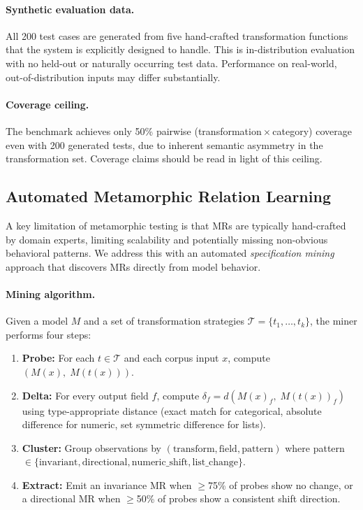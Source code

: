 \documentclass[sigconf,nonacm]{acmart}
\begin{document}
\paragraph{Synthetic evaluation data.}
All 200 test cases are generated from five hand-crafted transformation functions that the system is explicitly designed to handle.
This is in-distribution evaluation with no held-out or naturally occurring test data.
Performance on real-world, out-of-distribution inputs may differ substantially.

\paragraph{Coverage ceiling.}
The benchmark achieves only 50\% pairwise (transformation\,$\times$\,category) coverage even with 200 generated tests, due to inherent semantic asymmetry in the transformation set.
Coverage claims should be read in light of this ceiling.

\subsection{Automated Metamorphic Relation Learning}
\label{sec:auto-mr}

A key limitation of metamorphic testing is that MRs are typically hand-crafted by domain experts, limiting scalability and potentially missing non-obvious behavioral patterns.
We address this with an automated \emph{specification mining} approach that discovers MRs directly from model behavior.

\paragraph{Mining algorithm.}
Given a model $M$ and a set of transformation strategies $\mathcal{T} = \{t_1, \ldots, t_k\}$, the miner performs four steps:
\begin{enumerate}
  \item \textbf{Probe:} For each $t \in \mathcal{T}$ and each corpus input $x$, compute $(M(x),\; M(t(x)))$.
  \item \textbf{Delta:} For every output field $f$, compute $\delta_f = d(M(x)_f,\; M(t(x))_f)$ using type-appropriate distance (exact match for categorical, absolute difference for numeric, set symmetric difference for lists).
  \item \textbf{Cluster:} Group observations by $(\text{transform}, \text{field}, \text{pattern})$ where pattern $\in \{\text{invariant}, \text{directional}, \text{numeric\_shift}, \text{list\_change}\}$.
  \item \textbf{Extract:} Emit an invariance MR when $\geq$75\% of probes show no change, or a directional MR when $\geq$50\% of probes show a consistent shift direction.
\end{enumerate}
\end{document}
